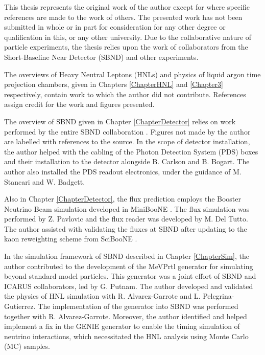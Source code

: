 
\begin{declaration}

This thesis represents the original work of the author except for where specific references are made to the work of others.
The presented work has not been submitted in whole or in part for consideration for any other degree or qualification in this, or any other university. 
Due to the collaborative nature of particle experiments, the thesis relies upon the work of collaborators from the Short-Baseline Near Detector (SBND) and other experiments.

The overviews of Heavy Neutral Leptons (HNLs) and physics of liquid argon time projection chambers, given in Chapters \ref{ChapterHNL} and \ref{Chapter3} respectively, contain work to which the author did not contribute.
References assign credit for the work and figures presented.

The overview of SBND given in Chapter \ref{ChapterDetector} relies on work performed by the entire SBND collaboration \cite{SBNProgram,sbnd_det}.
Figures not made by the author are labelled with references to the source.
In the scope of detector installation, the author helped with the cabling of the Photon Detection System (PDS) boxes and their installation to the detector alongside B. Carlson and B. Bogart.
The author also installed the PDS readout electronics, under the guidance of M. Stancari and W. Badgett.

Also in Chapter \ref{ChapterDetector}, the flux prediction employs the Booster Neutrino Beam simulation developed in MiniBooNE \cite{BNBFlux}.
The flux simulation was performed by Z. Pavlovic and the flux reader was developed by M. Del Tutto. 
The author assisted with validating the fluxes at SBND after updating to the kaon reweighting scheme from SciBooNE \cite{SciBooNE} .

In the simulation framework of SBND described in Chapter \ref{ChapterSim}, the author contributed to the development of the MeVPrtl generator for simulating beyond standard model particles.
This generator was a joint effort of SBND and ICARUS collaborators, led by G. Putnam.
The author developed and validated the physics of HNL simulation with R. Alvarez-Garrote and L. Pelegrina-Gutierrez.
The implementation of the generator into SBND was performed together with R. Alvarez-Garrote.
Moreover, the author identified and helped implement a fix in the GENIE generator to enable the timing simulation of neutrino interactions, which necessitated the HNL analysis using Monte Carlo (MC) samples.


\end{declaration}

